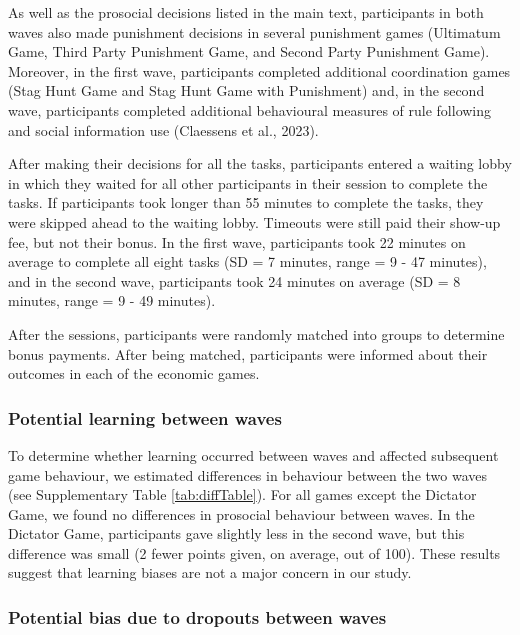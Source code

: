 \documentclass[
  man,floatsintext]{apa6}
\begin{document}
As well as the prosocial decisions listed in the main text, participants in both
waves also made punishment decisions in several punishment games (Ultimatum
Game, Third Party Punishment Game, and Second Party Punishment Game). Moreover,
in the first wave, participants completed additional coordination games (Stag
Hunt Game and Stag Hunt Game with Punishment) and, in the second wave,
participants completed additional behavioural measures of rule following and
social information use (Claessens et al., 2023).

After making their decisions for all the tasks, participants entered a waiting
lobby in which they waited for all other participants in their session to
complete the tasks. If participants took longer than 55 minutes to complete the
tasks, they were skipped ahead to the waiting lobby. Timeouts were still paid
their show-up fee, but not their bonus. In the first wave, participants took
22 minutes on average to
complete all eight tasks (SD =
7 minutes, range =
9 -
47
minutes), and in the second wave, participants took
24
minutes on average (SD = 8
minutes, range = 9 -
49 minutes).

After the sessions, participants were randomly matched into groups to determine
bonus payments. After being matched, participants were informed about their
outcomes in each of the economic games.

\hypertarget{potential-learning-between-waves}{%
\subsubsection{Potential learning between waves}\label{potential-learning-between-waves}}

To determine whether learning occurred between waves and affected subsequent
game behaviour, we estimated differences in behaviour between the two waves (see
Supplementary Table \ref{tab:diffTable}). For all games except the Dictator
Game, we found no differences in prosocial behaviour between waves. In the
Dictator Game, participants gave slightly less in the second wave, but this
difference was small (2 fewer points given, on average, out of 100). These
results suggest that learning biases are not a major concern in our study.

\hypertarget{potential-bias-due-to-dropouts-between-waves}{%
\subsubsection{Potential bias due to dropouts between waves}\label{potential-bias-due-to-dropouts-between-waves}}
\end{document}

